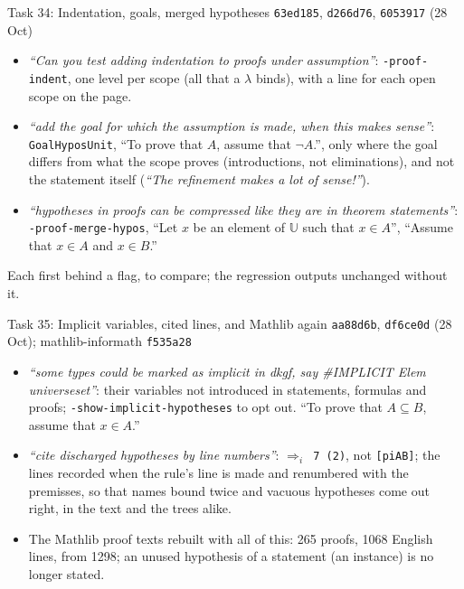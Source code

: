 \documentclass[10pt,aspectratio=169]{beamer}
\newcommand{\bad}[1]{\textcolor{warn}{#1}}
\newcommand{\ok}[1]{\textcolor{good}{#1}}
\newcommand{\commit}[1]{\texttt{\footnotesize #1}}
\begin{document}
\begin{frame}{Task 34: Indentation, goals, merged hypotheses}
  \commit{63ed185}, \commit{d266d76}, \commit{6053917} (28 Oct)
  \begin{itemize}\small
    \item \textit{``Can you test adding indentation to proofs under assumption''}:
          \texttt{-proof-indent}, one level per scope (all that a $\lambda$ binds), with a line
          for each open scope on the page.
    \item \textit{``add the goal for which the assumption is made, when this makes sense''}:
          \texttt{GoalHyposUnit}, ``To prove that $A$, assume that $\neg A$.'', only where the goal
          differs from what the scope proves (introductions, not eliminations), and not the
          statement itself (\textit{``The refinement makes a lot of sense!''}).
    \item \textit{``hypotheses in proofs can be compressed like they are in theorem
          statements''}: \texttt{-proof-merge-hypos}, ``Let $x$ be an element of $\mathbb{U}$
          such that $x \in A$'', ``Assume that $x \in A$ and $x \in B$.''
  \end{itemize}
  Each first behind a flag, to compare; the regression outputs unchanged without it.
\end{frame}

\begin{frame}{Task 35: Implicit variables, cited lines, and Mathlib again}
  \commit{aa88d6b}, \commit{df6ce0d} (28 Oct); mathlib-informath \commit{f535a28}
  \begin{itemize}\small
    \item \textit{``some types could be marked as implicit in dkgf, say \#IMPLICIT Elem
          universeset''}: their variables not introduced in statements, formulas and proofs;
          \texttt{-show-implicit-hypotheses} to opt out. ``To prove that $A \subseteq B$, assume
          that $x \in A$.''
    \item \textit{``cite discharged hypotheses by line numbers''}: \texttt{$\Rightarrow_i$ 7
          \ok{(2)}}, not \bad{\texttt{[piAB]}}; the lines recorded when the rule's line is made
          and renumbered with the premisses, so that names bound twice and vacuous hypotheses
          come out right, in the text and the trees alike.
    \item The Mathlib proof texts rebuilt with all of this: 265 proofs,
          \ok{1068 English lines, from 1298}; an unused hypothesis of a statement (an instance)
          is no longer stated.
  \end{itemize}
\end{frame}
\end{document}
